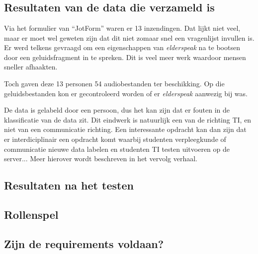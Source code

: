 
\chapter{}
\label{ch:resultaten}

\section{Resultaten van de data die verzameld is}
Via het formulier van ``JotForm'' waren er 13 inzendingen. Dat lijkt niet veel, maar er moet wel geweten zijn dat dit niet zomaar snel een vragenlijst invullen is. Er werd telkens gevraagd om een eigenschappen van \textit{elderspeak} na te bootsen door een geluidsfragment in te spreken. Dit is veel meer werk waardoor mensen sneller afhaakten.

Toch gaven deze 13 personen 54 audiobestanden ter beschikking. Op die geluidsbestanden kon er gecontroleerd worden of er \textit{elderspeak} aanwezig bij was.

De data is gelabeld door een persoon, dus het kan zijn dat er fouten in de klassificatie van de data zit. Dit eindwerk is natuurlijk een van de richting TI, en niet van een communicatie richting. Een interessante opdracht kan dan zijn dat er interdiciplinair een opdracht komt waarbij studenten verpleegkunde of communicatie nieuwe data labelen en studenten TI testen uitvoeren op de server... Meer hierover wordt beschreven in het vervolg verhaal.

\section{Resultaten na het testen}

\section{Rollenspel}

\section{Zijn de requirements voldaan?}
